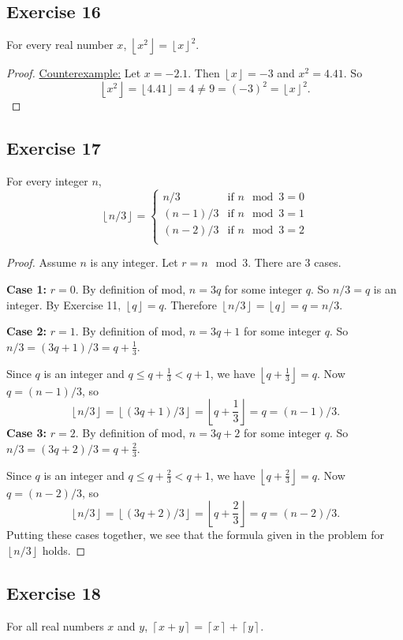 \documentclass[14pt]{extarticle}
\newcommand{\floor}[1]{{\left\lfloor#1\right\rfloor}}
\newcommand{\ceil}[1]{{\left\lceil#1\right\rceil}}
\begin{document}
\subsection{Exercise 16}
For every real number $x$, $\floor{x^2} = \floor{x}^2$.

\begin{proof}
\underline{Counterexample:} Let $x = -2.1$. Then $\floor{x} = -3$ and $x^2 = 4.41$. So 
\[
\floor{x^2} = \floor{4.41} = 4 \neq 9 = (-3)^2 = \floor{x}^2.
\]
\end{proof}

\subsection{Exercise 17}
For every integer $n$,
\[
\floor{n/3} =
\left\{
\begin{array}{lr}
n/3 & \text{if } n \mod 3 = 0\\
(n-1)/3 & \text{if } n \mod 3 = 1\\
(n-2)/3 & \text{if } n \mod 3 = 2\\
\end{array}
\right.
\]
\begin{proof}
Assume $n$ is any integer. Let $r = n \mod 3$. There are 3 cases.

{\bf Case 1:} $r = 0$. By definition of mod, $n = 3q$ for some integer $q$. So $n/3 = q$ is an integer. By Exercise 11, $\floor{q} = q$. Therefore $\floor{n/3} = \floor{q} = q = n / 3$.

{\bf Case 2:} $r = 1$. By definition of mod, $n = 3q + 1$ for some integer $q$. So $n/3 = (3q+1)/3 = q + \frac{1}{3}$. 

Since $q$ is an integer and $q \leq q + \frac{1}{3} < q+1$, we have $\floor{q+\frac{1}{3}} = q$. Now $q = (n-1)/3$, so 
\[
\floor{n/3} = \floor{(3q+1)/3} = \floor{q+\frac{1}{3}} = q = (n-1)/3.
\]
{\bf Case 3:} $r = 2$. By definition of mod, $n = 3q + 2$ for some integer $q$. So $n/3 = (3q+2)/3 = q + \frac{2}{3}$. 

Since $q$ is an integer and $q \leq q + \frac{2}{3} < q+1$, we have $\floor{q+\frac{2}{3}} = q$. Now $q = (n-2)/3$, so 
\[
\floor{n/3} = \floor{(3q+2)/3} = \floor{q+\frac{2}{3}} = q = (n-2)/3.
\]
Putting these cases together, we see that the formula given in the problem for $\floor{n/3}$ holds.
\end{proof}

\subsection{Exercise 18}
For all real numbers $x$ and $y$, $\ceil{x + y} = \ceil{x} + \ceil{y}$.
\end{document}
